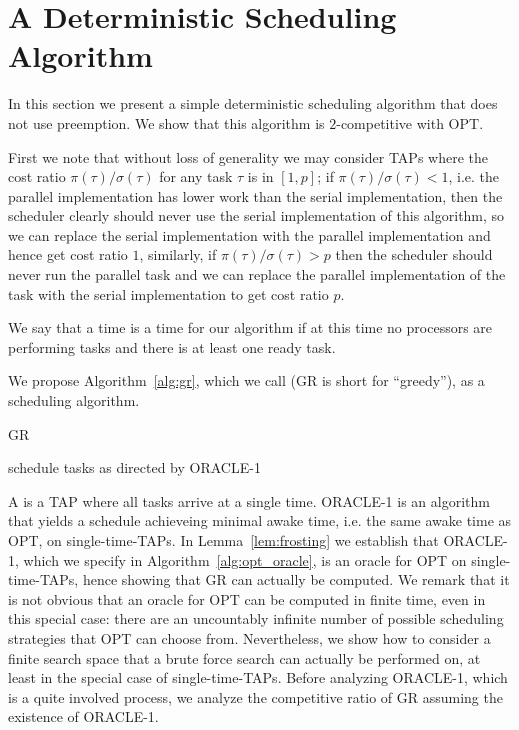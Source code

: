 \section{A Deterministic Scheduling Algorithm}
In this section we present a simple deterministic scheduling
algorithm that does not use preemption. We show that this
algorithm is $2$-competitive with OPT.

First we note that without loss of generality we may consider
TAPs where the cost ratio $\pi(\tau)/\sigma(\tau)$ for any task
$\tau$ is in $[1,p]$; if $\pi(\tau)/\sigma(\tau) < 1$, i.e. the
parallel implementation has lower work than the serial
implementation, then the scheduler clearly should never use the
serial implementation of this algorithm, so we can replace the
serial implementation with the parallel implementation and hence
get cost ratio $1$, similarly, if $\pi(\tau)/\sigma(\tau) > p$
then the scheduler should never run the parallel task and we can
replace the parallel implementation of the task with the serial
implementation to get cost ratio $p$.

We say that a time is a  time for our algorithm if at
this time no processors are performing tasks and there is at
least one ready task.

We propose Algorithm~\ref{alg:gr}, which we call 
(GR is short for \enquote{greedy}), as a scheduling algorithm.

\begin{algorithm}
  \caption{GR}
  \label{alg:gr}
  \begin{algorithmic}
        \State schedule tasks as directed by ORACLE-1 
      \EndIf
    \EndWhile
  \end{algorithmic}
\end{algorithm}

A  is a TAP where all tasks arrive at a
single time. ORACLE-1 is an algorithm that yields a schedule
achieveing minimal awake time, i.e. the same awake time as OPT,
on single-time-TAPs. In Lemma~\ref{lem:frosting} we
establish that ORACLE-1, which we specify in
Algorithm~\ref{alg:opt_oracle}, is an oracle for OPT on
single-time-TAPs, hence showing that GR can actually be computed.
We remark that it is not obvious that an oracle for OPT can be
computed in finite time, even in this special case: there are an
uncountably infinite number of possible scheduling strategies
that OPT can choose from. Nevertheless, we show how to consider a
finite search space that a brute force search can actually be
performed on, at least in the special case of single-time-TAPs.
Before analyzing ORACLE-1, which is a quite involved process, we
analyze the competitive ratio of GR assuming the existence of
ORACLE-1. 


